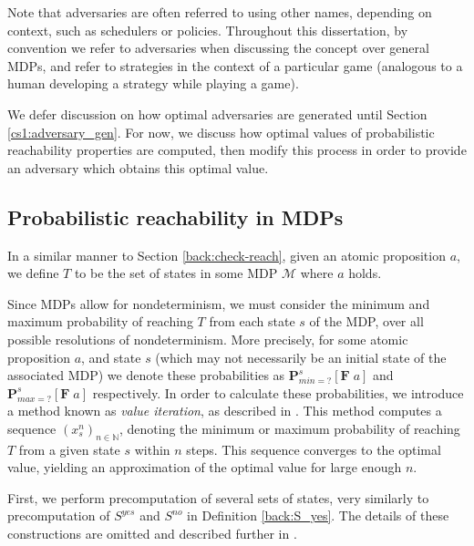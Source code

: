 Note that adversaries are often referred to using other names, depending on context, such as schedulers or policies. Throughout this dissertation, by convention we refer to adversaries when discussing the concept over general MDPs, and refer to strategies in the context of a particular game (analogous to a human developing a strategy while playing a game).

We defer discussion on how optimal adversaries are generated until Section \ref{cs1:adversary_gen}. For now, we discuss how optimal values of probabilistic reachability properties are computed, then modify this process in order to provide an adversary which obtains this optimal value.

\subsection{Probabilistic reachability in MDPs}
\label{cs1:prob_reach_mdps}

In a similar manner to Section \ref{back:check-reach}, given an atomic proposition $a$, we define $T$ to be the set of states in some MDP $\mathcal{M}$ where $a$ holds.

Since MDPs allow for nondeterminism, we must consider the minimum and maximum probability of reaching $T$ from each state $s$ of the MDP, over all possible resolutions of nondeterminism. More precisely, for some atomic proposition $a$, and state $s$ (which may not necessarily be an initial state of the associated MDP) we denote these probabilities as $\mathbf{P}^{s}_{min=?} [\mathbf{F} \; a]$ and $\mathbf{P}^{s}_{max=?} [\mathbf{F} \; a]$ respectively. In order to calculate these probabilities, we introduce a method known as \emph{value iteration}, as described in \cite{chatterjee_value_2008}. This method computes a sequence $(x^n_s)_{n \in \mathbb{N}}$, denoting the minimum or maximum probability of reaching $T$ from a given state $s$ within $n$ steps. This sequence converges to the optimal value, yielding an approximation of the optimal value for large enough $n$.

First, we perform precomputation of several sets of states, very similarly to precomputation of $S^{yes}$ and $S^{no}$ in Definition \ref{back:S_yes}.
The details of these constructions are omitted and described further in \cite{forejt_automated_2011}. %

